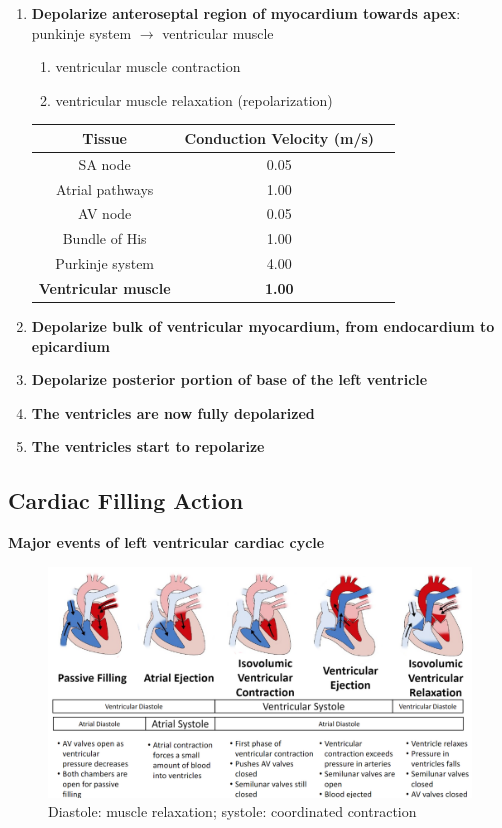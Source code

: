 \documentclass[11pt,fleqn]{book}
\begin{document}
\begin{enumerate}
    \item \textbf{Depolarize anteroseptal
region of myocardium
towards apex}: punkinje system $\rightarrow$ ventricular muscle
    \begin{enumerate}[start=5]
        \item ventricular muscle contraction
        \item ventricular muscle relaxation (repolarization)
    \end{enumerate}
\begin{tabular}{ccc}
\textbf{Tissue}  & \textbf{Conduction Velocity (m/s)} \\
\hline
SA node                                  & 0.05 \\
Atrial pathways                          & 1.00 \\
AV node                                  & 0.05 \\
Bundle of His&1.00\\
Purkinje system&4.00\\
\textbf{Ventricular muscle}&\textbf{1.00}
\end{tabular}
    \item \textbf{Depolarize bulk of
ventricular myocardium,
from endocardium to
epicardium}
    \item \textbf{Depolarize posterior
portion of base of
the left ventricle}
    \item \textbf{The ventricles are
now fully depolarized}
    \item \textbf{The ventricles
start to repolarize}
\end{enumerate}

\subsection{Cardiac Filling Action}
\textbf{Major events of left ventricular cardiac cycle}
\begin{figure}[h!]
\begin{center}
    \includegraphics[width=1\linewidth]{Pictures/Screenshot 2024-04-04 001601.png}
    \caption{Diastole: muscle relaxation; systole: coordinated contraction}
\end{center}
\end{figure}
\end{document}
